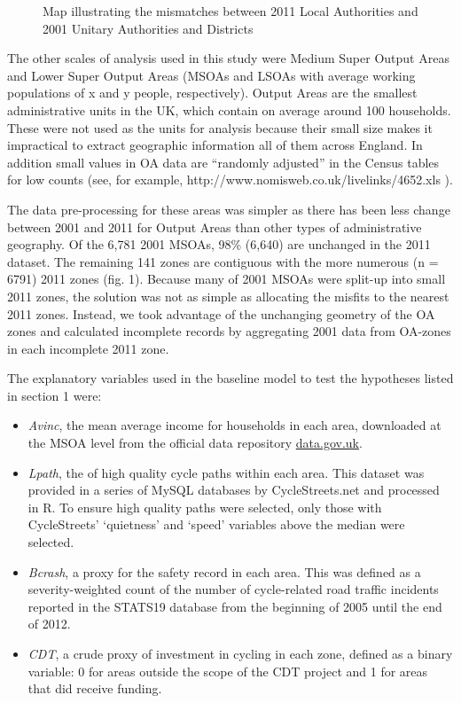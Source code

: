 \begin{figure}[htbp]
\centering
\caption{Map illustrating the mismatches between 2011 Local Authorities
and 2001 Unitary Authorities and Districts}
\end{figure}

The other scales of analysis used in this study were Medium Super Output
Areas and Lower Super Output Areas (MSOAs and LSOAs with average working
populations of x and y people, respectively). Output Areas are the
smallest administrative units in the UK, which contain on average around
100 households. These were not used as the units for analysis because
their small size makes it impractical to extract geographic information
all of them across England. In addition small values in OA data are
``randomly adjusted'' in the Census tables for low counts (see, for
example, http://www.nomisweb.co.uk/livelinks/4652.xls ).

The data pre-processing for these areas was simpler as there has been
less change between 2001 and 2011 for Output Areas than other types of
administrative geography. Of the 6,781 2001 MSOAs, 98\% (6,640) are
unchanged in the 2011 dataset. The remaining 141 zones are contiguous
with the more numerous (n = 6791) 2011 zones (fig. 1). Because many of
2001 MSOAs were split-up into small 2011 zones, the solution was not as
simple as allocating the misfits to the nearest 2011 zones. Instead, we
took advantage of the unchanging geometry of the OA zones and calculated
incomplete records by aggregating 2001 data from OA-zones in each
incomplete 2011 zone.

The explanatory variables used in the baseline model to test the
hypotheses listed in section 1 were:

\begin{itemize}
\item
  \emph{Avinc}, the mean average income for households in each area,
  downloaded at the MSOA level from the official data repository
  \href{http://data.gov.uk/dataset/household_earnings_estimates_-_model-based_estimates_of_income_for_msoas}{data.gov.uk}.
\item
  \emph{Lpath}, the of high quality cycle paths within each area. This
  dataset was provided in a series of MySQL databases by
  CycleStreets.net and processed in R. To ensure high quality paths were
  selected, only those with CycleStreets' `quietness' and `speed'
  variables above the median were selected.
\item
  \emph{Bcrash}, a proxy for the safety record in each area. This was
  defined as a severity-weighted count of the number of cycle-related
  road traffic incidents reported in the STATS19 database from the
  beginning of 2005 until the end of 2012.
\item
  \emph{CDT}, a crude proxy of investment in cycling in each zone,
  defined as a binary variable: 0 for areas outside the scope of the CDT
  project and 1 for areas that did receive funding.
\end{itemize}

